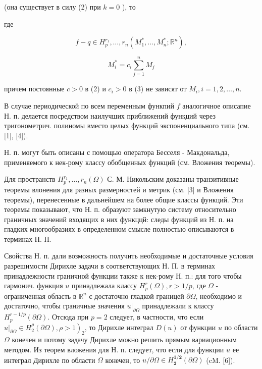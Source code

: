 \documentclass[10pt]{article}
\begin{document}
(она существует в силу (2) при $k=0$ ), то



где



\[

f-q \in H_{p}^{r_{1}}, \ldots, r_{n}\left(M_{1}^{*}, \ldots, M_{n}^{*} ; \mathbb{R}^{n}\right),

\]



\[

M_{i}^{*}=c_{i} \sum_{j=1}^{n} M_{j}

\]



причем постоянные $c>0$ в (2) и $c_{i}>0$ в (3) не зависят от $M_{i}, i=1,2, \ldots, n$.



В случае периодической по всем переменным функпий $f$ аналогичное описапие Н. п. делается посредством наилучших приближений фунқций через тригонометрич. полиномы вместо целых функций экспоненциального типа (см. [1], [4]).



Н. п. могут быть описаны с помощью оператора Бесселя - Макдональда, применяемого к нек-рому классу обобщенных функций (см. Вложения теоремы).



Для пространств $H_{p}^{r_{1}}, \ldots, r_{n}(\Omega)$ С. М. Никольским доказаны транзитивные теоремы влонения для разных размерностей и метрик (см. [3] и Вложения теоремы), перенесенные в дальнейшем на более общие классы функций. Эти теоремы показывают, что Н. п. образуют замкнутую систему относительно граничных значений входящих в них функццй: следы функций из Н. п. на гладких многообразиях в определенном смысле полностью описываются в терминах Н. П.



Свойства Н. п. дали возможность получить необходимые и достаточные условия разрешимости Дирихле задачи в соответствующих Н. П. в терминах принадлежности граничной функции также к нек-рому Н. п.: для того чтобы гармонич. функция $u$ принадлежала классу $H_{p}^{r}(\Omega), r>1 / p$, где $\Omega$ - ограниченная область в $\mathbb{R}^{n}$ с достаточно гладкой границей $\partial \Omega$, необходимо и достаточно, чтобы граничные значения $\left.u\right|_{\partial \Omega}$ принадлежали к классу $H_{p}^{r-1 / p}(\partial \Omega)$. Отсюда при $p=2$ следует, в частности, что если $\left.\left.u\right|_{\partial \Omega} \in H_{2}^{\rho}(\partial \Omega), \rho>1\right)_{2}$, то Дирихле интеграл $D(u)$ от функции $u$ по области $\Omega$ конечен и потому задачу Дирихле можно решить прямым вариационным методом. Из теорем вложения для Н. п. следует, что если для функции $u$ ее интеграл Дирихле по области $\Omega$ конечен, то $u / \partial \Omega \in H_{\mathbf{2}}^{\mathbf{1 / 2}}(\partial \Omega)$ (cM. [6]).
\end{document}
